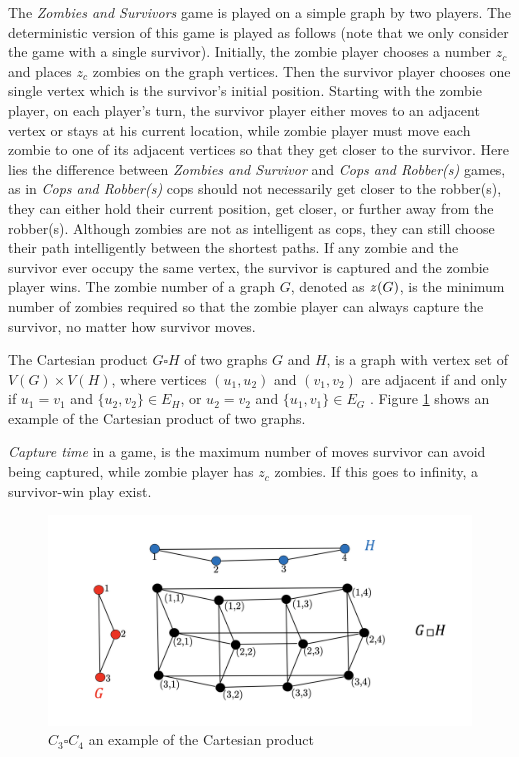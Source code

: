 \documentclass[1p]{elsarticle}
\newcommand{\zn}{\ooalign{$z$\cr\hfil\rule[.5ex]{.2em}{.08ex}\hfil\cr}}
\begin{document}
The {\it Zombies and Survivors} game is played on a simple graph by two players. The deterministic version of this game
\cite{Fitz16} is played as follows (note that we only consider the game with a single survivor). Initially, the zombie
player chooses a number $z_c$ and places $z_c$ zombies on the graph vertices. Then the survivor player chooses one
single vertex which is the survivor's initial position. Starting with the zombie player, on each player's turn, the
survivor player either moves to an adjacent vertex or stays at his current location, while zombie player must move each
zombie to one of its adjacent vertices so that they get closer to the survivor. Here lies the difference between {\it
Zombies and Survivor} and {\it Cops and Robber(s)} games, as in {\it Cops and Robber(s)} cops should not necessarily get
closer to the robber(s), they can either hold their current position, get closer, or further away from the robber(s).
Although zombies are not as intelligent as cops, they can still choose their path intelligently between the shortest
paths. If any zombie and the survivor ever occupy the same vertex, the survivor is captured and the zombie player wins.
The zombie number of a graph $G$, denoted as $\zn(G)$, is the minimum number of zombies required so that the zombie
player can always capture the survivor, no matter how survivor moves.

The Cartesian product $G \square H$ of two graphs $G$ and $H$, is a graph with vertex set of $V(G) \times V(H)$, where
vertices $(u_1 , u_2)$ and $(v_1 , v_2)$ are adjacent if and only if $u_1 = v_1$ and $ \{ u_2 , v_2 \} \in E_{H} $, or
$u_2 = v_2$ and $ \{u_1 , v_1 \} \in E_{G}$ \cite{West02}. Figure \ref{fig:p2} shows an example of the Cartesian product
of two graphs.

{\it Capture time} in a game, is the maximum number of moves survivor can avoid being captured, while zombie player has
$z_c$ zombies. If this goes to infinity, a survivor-win play exist.

\begin{figure}[h!]
	\centering
	\includegraphics[width=0.9\linewidth]{CpWest.png}
	\caption{$C_3 \square C_4$ an example of the Cartesian product}
	\label{fig:p2}
\end{figure}
\end{document}
